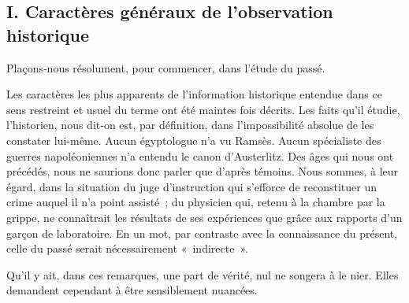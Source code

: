 \documentclass[french,twoside]{book} %
\newcommand{\astermono}{\medskip\centerline{\color{rubric}\large\selectfont{\syms ✻}}\medskip\par}%
\begin{document}
\subsection[{I. Caractères généraux de l’observation historique}]{I. Caractères généraux de l’observation historique}
\noindent  {}
\label{p17} Plaçons‑nous résolument, pour commencer, dans l’étude du passé.\par
Les caractères les plus apparents de l’information historique entendue dans ce sens restreint et usuel du terme ont été maintes fois décrits. Les faits qu’il étudie, l’historien, nous dit‑on est, par définition, dans l’impos­sibilité absolue de les constater lui-même. Aucun égyptologue n’a vu Ramsès. Aucun spécialiste des guerres napoléoniennes n’a entendu le canon d’Austerlitz. Des âges qui nous ont précédés, nous ne saurions donc parler que d’après témoins. Nous sommes, à leur égard, dans la situation du juge d’instruction qui s’efforce de reconstituer un crime auquel il n’a point assisté ; du physicien qui, retenu à la chambre par la grippe, ne connaîtrait les résultats de ses expériences que grâce aux rap­ports d’un garçon de laboratoire. En un mot, par contraste avec la con­naissance du présent, celle du passé serait nécessairement « indirecte ».\par
Qu’il y ait, dans ces remarques, une part de vérité, nul ne songera à le nier. Elles demandent cependant à être sensiblement nuancées.\par

\astermono
\end{document}
